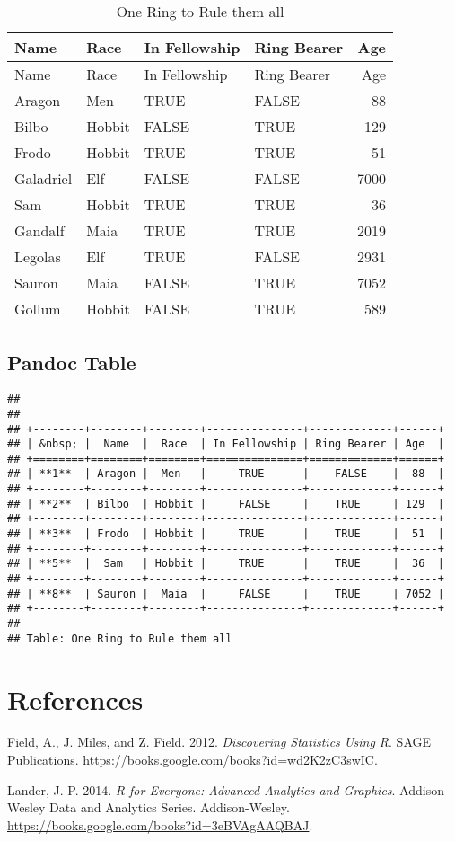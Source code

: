 \documentclass[
]{article}
\begin{document}
\begin{longtable}[]{@{}llllr@{}}
\caption{One Ring to Rule them all}\tabularnewline
\toprule
Name & Race & In Fellowship & Ring Bearer & Age\tabularnewline
\midrule
\endfirsthead
\toprule
Name & Race & In Fellowship & Ring Bearer & Age\tabularnewline
\midrule
\endhead
Aragon & Men & TRUE & FALSE & 88\tabularnewline
Bilbo & Hobbit & FALSE & TRUE & 129\tabularnewline
Frodo & Hobbit & TRUE & TRUE & 51\tabularnewline
Galadriel & Elf & FALSE & FALSE & 7000\tabularnewline
Sam & Hobbit & TRUE & TRUE & 36\tabularnewline
Gandalf & Maia & TRUE & TRUE & 2019\tabularnewline
Legolas & Elf & TRUE & FALSE & 2931\tabularnewline
Sauron & Maia & FALSE & TRUE & 7052\tabularnewline
Gollum & Hobbit & FALSE & TRUE & 589\tabularnewline
\bottomrule
\end{longtable}

\hypertarget{pandoc-table}{%
\subsection{Pandoc Table}\label{pandoc-table}}

\begin{verbatim}
## 
## 
## +--------+--------+--------+---------------+-------------+------+
## | &nbsp; |  Name  |  Race  | In Fellowship | Ring Bearer | Age  |
## +========+========+========+===============+=============+======+
## | **1**  | Aragon |  Men   |     TRUE      |    FALSE    |  88  |
## +--------+--------+--------+---------------+-------------+------+
## | **2**  | Bilbo  | Hobbit |     FALSE     |    TRUE     | 129  |
## +--------+--------+--------+---------------+-------------+------+
## | **3**  | Frodo  | Hobbit |     TRUE      |    TRUE     |  51  |
## +--------+--------+--------+---------------+-------------+------+
## | **5**  |  Sam   | Hobbit |     TRUE      |    TRUE     |  36  |
## +--------+--------+--------+---------------+-------------+------+
## | **8**  | Sauron |  Maia  |     FALSE     |    TRUE     | 7052 |
## +--------+--------+--------+---------------+-------------+------+
## 
## Table: One Ring to Rule them all
\end{verbatim}

\hypertarget{references}{%
\section*{References}\label{references}}

\hypertarget{refs}{}
\leavevmode\hypertarget{ref-field2012discovering}{}%
Field, A., J. Miles, and Z. Field. 2012. \emph{Discovering Statistics
Using R}. SAGE Publications.
\url{https://books.google.com/books?id=wd2K2zC3swIC}.

\leavevmode\hypertarget{ref-lander2014r}{}%
Lander, J. P. 2014. \emph{R for Everyone: Advanced Analytics and
Graphics}. Addison-Wesley Data and Analytics Series. Addison-Wesley.
\url{https://books.google.com/books?id=3eBVAgAAQBAJ}.
\end{document}

